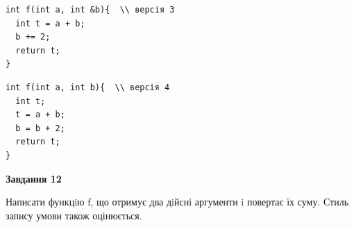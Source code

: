 \documentclass[12pt, ukrainian]{article}
\begin{document}
{\begin {large}
\begin{minipage}[t]{11.0cm}
\vspace{-8mm}\begin{verbatim}
int f(int a, int &b){  \\ версія 3
  int t = a + b;
  b += 2;
  return t;
}
\end{verbatim}

\vspace{-8mm}\begin{verbatim}
int f(int a, int b){  \\ версія 4
  int t;
  t = a + b;
  b = b + 2;
  return t;
}
\end{verbatim}



\begin{center}
\textbf{Завдання 12}
\end{center}

Написати функцiю f, що отримує два дiйсні аргументи i повертає їх суму. Стиль запису умови також оцінюється.\par

\end{minipage}

\end {large}}
\newpage
\end{document}
